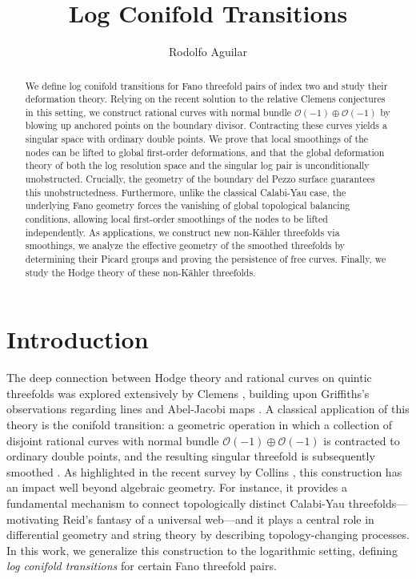\documentclass[11pt]{article}
\title{Log Conifold Transitions}
\author{Rodolfo Aguilar}
\date{}
\theoremstyle{definition}
\newcommand{\OO}{\mathcal{O}}
\begin{document}
\maketitle

\begin{abstract}
We define log conifold transitions for Fano threefold pairs of index two and study their deformation theory. Relying on the recent solution to the relative Clemens conjectures in this setting, we construct rational curves with normal bundle $\OO(-1)\oplus \OO(-1)$ by blowing up anchored points on the boundary divisor. Contracting these curves yields a singular space with ordinary double points. We prove that local smoothings of the nodes can be lifted to global first-order deformations, and that the global deformation theory of both the log resolution space and the singular log pair is unconditionally unobstructed. Crucially, the geometry of the boundary del Pezzo surface guarantees this unobstructedness. Furthermore, unlike the classical Calabi-Yau case, the underlying Fano geometry forces the vanishing of global topological balancing conditions, allowing local first-order smoothings of the nodes to be lifted independently.
 As applications, we construct new non-Kähler threefolds via smoothings, we analyze the effective geometry of the smoothed threefolds by determining their Picard groups and proving the persistence of free curves. Finally, we study the Hodge theory of these non-Kähler threefolds.
\end{abstract}


\tableofcontents
\section{Introduction}
The deep connection between Hodge theory and rational curves on quintic threefolds was explored extensively by Clemens \cite{C83, C87}, building upon Griffiths's observations regarding lines and Abel-Jacobi maps \cite{G69}. A classical application of this theory is the conifold transition: a geometric operation in which a collection of disjoint rational curves with normal bundle $\OO(-1)\oplus\OO(-1)$ is contracted to ordinary double points, and the resulting singular threefold is subsequently smoothed \cite{C83b, F86}. As highlighted in the recent survey by Collins \cite{C25}, this construction has an impact well beyond algebraic geometry. For instance, it provides a fundamental mechanism to connect topologically distinct Calabi-Yau threefolds—motivating Reid's fantasy of a universal web—and it plays a central role in differential geometry and string theory by describing topology-changing processes. In this work, we generalize this construction to the logarithmic setting, defining \textit{log conifold transitions} for certain Fano threefold pairs.
\end{document}
